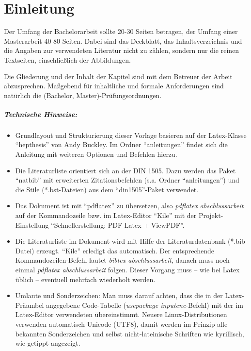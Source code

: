 \chapter{Einleitung}
\label{kap-einleitung}



Der Umfang der Bachelorarbeit sollte 20-30 Seiten betragen, der Umfang einer Masterarbeit 40-80 Seiten.
Dabei sind das Deckblatt, das  Inhaltsverzeichnis  und  die  Angaben  zur  verwendeten  Literatur  nicht  zu  zählen, sondern nur die reinen Textseiten, einschließlich der Abbildungen.

Die Gliederung und der Inhalt der Kapitel sind mit dem Betreuer der Arbeit abzusprechen. Maßgebend für inhaltliche und formale Anforderungen sind natürlich die (Bachelor, Master)-\-Prüfungs\-ordnungen.

\paragraph{Technische Hinweise:}
\begin{itemize}
  \item Grundlayout und Strukturierung dieser Vorlage basieren auf der Latex-Klasse ``hepthesis'' von Andy Buckley. Im Ordner ``anleitungen'' findet sich die Anleitung mit weiteren Optionen und Befehlen hierzu.
  \item Die Literaturliste orientiert sich an der DIN 1505. Dazu werden das Paket ``natbib'' mit erweiterten Zitationsbefehlen (s.a. Ordner ``anleitungen'') und die Stile (*.bst-Dateien) aus dem ``din1505''-Paket verwendet. 
  \item Das Dokument ist mit ``pdflatex'' zu übersetzen, also \textit{pdflatex abschlussarbeit} auf der Kommandozeile bzw. im Latex-Editor ``Kile'' mit der Projekt-Einstellung ``Schnell\-erstellung: PDF-Latex + ViewPDF''.
  \item Die Literaturliste im Dokument wird mit Hilfe der Literaturdatenbank (*.bib-Datei) erzeugt. ``Kile'' erledigt das automatisch. Der entsprechende Kommando\-zeilen-Befehl lautet \textit{bibtex abschlussarbeit}, danach muss noch einmal \textit{pdflatex abschlussarbeit} folgen. Dieser Vorgang muss -- wie bei Latex üblich -- eventuell mehrfach wiederholt werden.
  \item Umlaute und Sonderzeichen: Man muss darauf achten, dass die in der Latex-Präambel angegebene Code-Tabelle (\textit{usepackage inputenc}-Befehl) mit der im Latex-Editor verwendeten übereinstimmt. Neuere Linux-Distributionen verwenden automatisch Unicode (UTF8), damit werden im Prinzip alle bekannten Sonderzeichen und selbst nicht-lateinische Schriften wie kyrillisch, wie getippt angezeigt.
\end{itemize}

